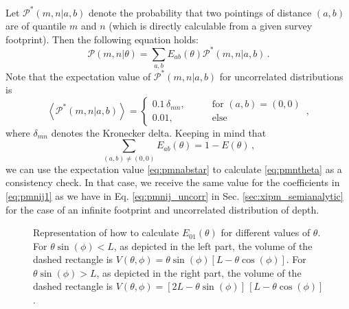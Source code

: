 \documentclass{aa}
\def\la{\left<}
\def\ra{\right>}
\begin{document}
\begin{appendix}
Let $\mathcal{P}^*(m,n|a,b)$ denote the probability that two pointings of distance $(a,b)$ are of quantile $m$ and $n$ (which is directly calculable from a given survey footprint). 
Then the following equation holds: \begin{equation}
\mathcal{P}(m,n|\theta) = \sum_{a,b} E_{ab}(\theta)\mathcal{P}^*(m,n|a,b)\, .
\label{eq:pmntheta}
\end{equation}
Note that the expectation value of $\mathcal{P}^*(m,n|a,b)$ for uncorrelated distributions is \begin{equation}
\la \mathcal{P}^*(m,n|a,b)\ra = \begin{cases}
0.1\,\delta_{mn},\qquad & \text{for }(a,b)=(0,0) \\
0.01, & \text{else}
\end{cases}\, ,
\label{eq:pmnabstar}
\end{equation}
where $\delta_{mn}$ denotes the Kronecker delta. Keeping in mind that \begin{equation}
\sum_{(a,b)\neq (0,0)} E_{ab}(\theta) = 1-E(\theta)\, ,
\end{equation}
we can use the expectation value \eqref{eq:pmnabstar} to calculate \eqref{eq:pmntheta} as a consistency check. In that case, we receive the same value for the coefficients in \eqref{eq:pmnij1} as we have in Eq. \eqref{eq:pmnij_uncorr} in Sec. \ref{sec:xipm_semianalytic} for the case of an infinite footprint and uncorrelated distribution of depth.

\begin{figure}
\centering
\sidecaption
\begin{subfigure}[c]{6cm}
\def\svgwidth{100pt}
\hspace*{1cm}

\end{subfigure}
\begin{subfigure}[c]{6cm}
\def\svgwidth{100pt}
\hspace*{1cm}

\end{subfigure}
\caption[How to calculate $E_{01}(\theta)$]{Representation of how to calculate $E_{01}(\theta)$ for different values of $\theta$. For $\theta\sin(\phi)<L$, as depicted in the left part, the volume of the dashed rectangle is $V(\theta,\phi)=\theta\sin(\phi)[L-\theta\cos(\phi)]$. For $\theta\sin(\phi)>L$, as depicted in the right part, the volume of the dashed rectangle is $V(\theta,\phi)=[2L-\theta\sin(\phi)]\, [L-\theta\cos(\phi)]$.}
\label{fig:e01theta}
\end{figure}


\end{appendix}
\end{document}
